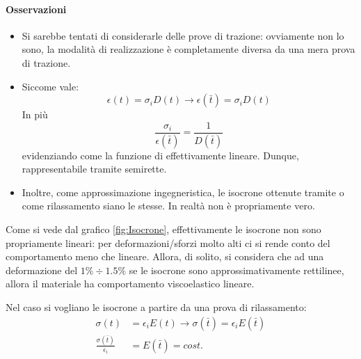 \paragraph{Osservazioni}
\begin{itemize}
\item Si sarebbe tentati di considerarle delle prove di trazione: ovviamente non lo sono, la modalità di realizzazione è completamente diversa da una mera prova di trazione.
\item Siccome vale:
\begin{equation}
\epsilon(t) = \sigma_iD(t) \rightarrow \epsilon(\bar{t}) = \sigma_iD(t)
\end{equation}
In più \begin{equation}
\frac{\sigma_i}{\epsilon(\bar{t})} = \frac{1}{D(\bar{t})}
\end{equation}
evidenziando come la funzione di effettivamente lineare. Dunque, rappresentabile tramite semirette.
\item Inoltre, come approssimazione ingegneristica, le isocrone ottenute tramite  o come rilassamento siano le stesse. In realtà non è propriamente vero.
\end{itemize}

Come si vede dal grafico \ref{fig:Isocrone}, effettivamente le isocrone non sono propriamente lineari: per deformazioni/sforzi molto alti ci si rende conto del comportamento meno che lineare.
Allora, di solito, si considera che ad una deformazione del $1\% \div 1.5\%$ se le isocrone sono approssimativamente rettilinee, allora il materiale ha comportamento viscoelastico lineare.

Nel caso si vogliano le isocrone a partire da una prova di rilassamento:
\begin{equation}
\begin{split}
\sigma(t) &= \epsilon_iE(t) \rightarrow \sigma(\bar{t}) = \epsilon_iE(\bar{t})\\
\frac{\sigma(\bar{t})}{\epsilon_i} &= E(\bar{t}) = cost.
\end{split}
\end{equation}


